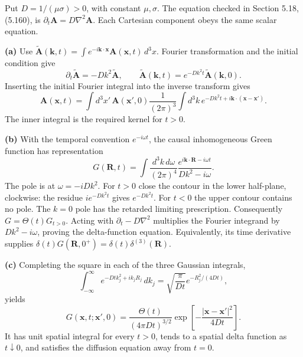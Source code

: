 Put $D=1/(\mu\sigma)>0$, with constant $\mu,\sigma$. The equation
checked in Section 5.18, (5.160), is $\partial_t\mathbf A=D\nabla^2\mathbf A$.
Each Cartesian component obeys the same scalar equation.

\textbf{(a)} Use $\widetilde{\mathbf A}(\mathbf k,t)=
\int e^{-i\mathbf k\cdot\mathbf x}\mathbf A(\mathbf x,t)\,d^3x$.
Fourier transformation and the initial condition give
\[
\partial_t\widetilde{\mathbf A}=-Dk^2\widetilde{\mathbf A},\qquad
\widetilde{\mathbf A}(\mathbf k,t)=e^{-Dk^2t}\widetilde{\mathbf A}(\mathbf k,0).
\]
Inserting the initial Fourier integral into the inverse transform gives
\[
\mathbf A(\mathbf x,t)=\int d^3x'\,\mathbf A(\mathbf x',0)
\frac1{(2\pi)^3}\int d^3k\,e^{-Dk^2t+i\mathbf k\cdot(\mathbf x-\mathbf x')}.
\]
The inner integral is the required kernel for $t>0$.

\textbf{(b)} With the temporal convention $e^{-i\omega t}$, the causal
inhomogeneous Green function has representation
\[
G(\mathbf R,t)=\int\frac{d^3k\,d\omega}{(2\pi)^4}
\frac{e^{i\mathbf k\cdot\mathbf R-i\omega t}}{Dk^2-i\omega}.
\]
The pole is at $\omega=-iDk^2$. For $t>0$ close the contour in the lower
half-plane, clockwise: the residue $i e^{-Dk^2t}$ gives
$e^{-Dk^2t}$. For $t<0$ the upper contour contains no pole. The $k=0$
pole has the retarded limiting prescription. Consequently
$G=\Theta(t)G_{t>0}$. Acting with $\partial_t-D\nabla^2$ multiplies the
Fourier integrand by $Dk^2-i\omega$, proving the delta-function equation.
Equivalently, its time derivative supplies
$\delta(t)G(\mathbf R,0^+)=\delta(t)\delta^{(3)}(\mathbf R)$.

\textbf{(c)} Completing the square in each of the three Gaussian integrals,
\[
\int_{-\infty}^{\infty}e^{-Dtk_j^2+ik_jR_j}\,dk_j
=\sqrt{\frac\pi{Dt}}e^{-R_j^2/(4Dt)},
\]
yields
\[
\boxed{G(\mathbf x,t;\mathbf x',0)=
\frac{\Theta(t)}{(4\pi Dt)^{3/2}}
\exp\left[-\frac{|\mathbf x-\mathbf x'|^2}{4Dt}\right].}
\]
It has unit spatial integral for every $t>0$, tends to a spatial delta
function as $t\downarrow0$, and satisfies the diffusion equation away from $t=0$.

